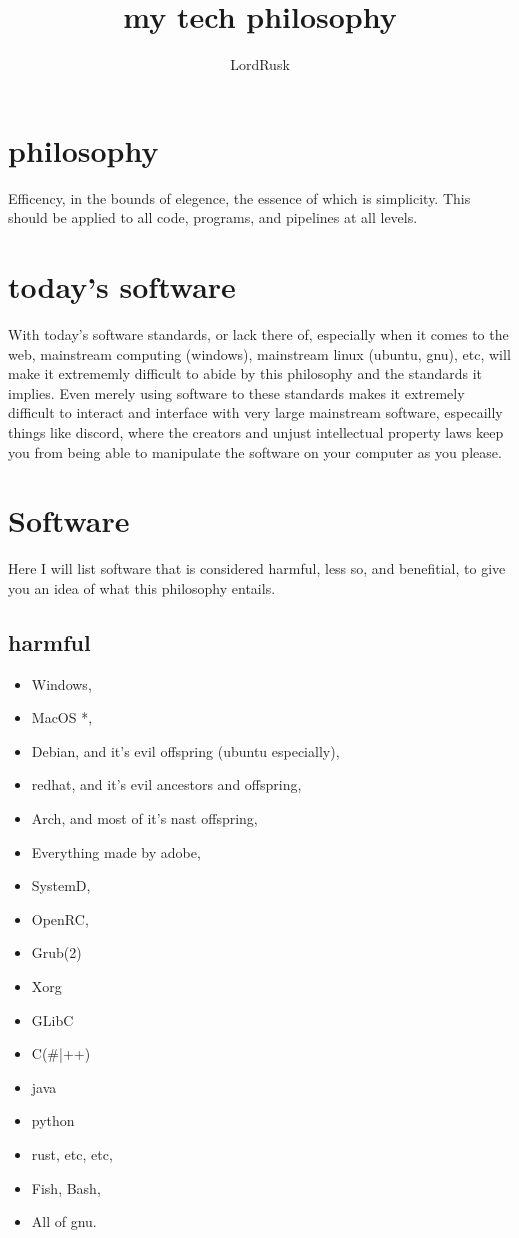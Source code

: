 \documentclass{article}
\title{my tech philosophy}
\author{LordRusk}
\renewcommand{\maketitle}{
\begin{center}
	\Huge
	\bfseries
	\theauthor
\end{center}
}
\begin{document}
\maketitle

\section{philosophy}
Efficency, in the bounds of elegence, the essence of which is simplicity. This should be applied to all code, programs, and pipelines at all levels.

\section{today's software}
With today's software standards, or lack there of, especially when it comes to the web, mainstream computing (windows), mainstream linux (ubuntu, gnu), etc, will make it extrememly difficult to abide by this philosophy and the standards it implies. Even merely using software to these standards makes it extremely difficult to interact and interface with very large mainstream software, especailly things like discord, where the creators and unjust intellectual property laws keep you from being able to manipulate the software on your computer as you please.

\section{Software}
Here I will list software that is considered harmful, less so, and benefitial, to give you an idea of what this philosophy entails.

\subsection{harmful}
\begin{itemize}
	\item Windows,
	\item MacOS *,
	\item Debian, and it's evil offspring (ubuntu especially),
	\item redhat, and it's evil ancestors and offspring,
	\item Arch, and most of it's nast offspring,
	\item Everything made by adobe,
	\item SystemD,
	\item OpenRC,
	\item Grub(2)
	\item Xorg
	\item GLibC
	\item C(\#|++)
	\item java
	\item python
	\item rust, etc, etc,
	\item Fish, Bash,
	\item All of gnu.
\end{itemize}
\end{document}
